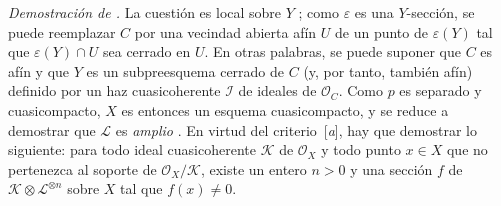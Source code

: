 \documentclass[oneside,10pt]{amsart}
\newcommand{\oldpage}[2][]{\marginnote{\normalfont\footnotesize\textbf{#1}~|~#2}\ignorespaces}
\let\EGAOriginalLabel\label
\renewcommand{\label}[1]{\phantomsection\EGAOriginalLabel{#1}}
\begin{document}
\begin{env}[8.10.6]
\label{II.8.10.6-fr}
\emph{Demostración de .}
La cuestión es local sobre $Y$ ;
como $\varepsilon$ es una $Y$-sección, se puede reemplazar $C$ por una vecindad abierta afín $U$ de un punto de $\varepsilon(Y)$ tal que $\varepsilon(Y)\cap U$ sea cerrado en $U$.
En otras palabras, se puede suponer que $C$ es afín y que $Y$ es un subpreesquema cerrado de $C$ (y, por tanto, también afín) definido por un haz cuasicoherente
\oldpage[II]{188}
$\mathcal{I}$ de ideales de $\mathcal{O}_C$.
Como $p$ es separado y cuasicompacto, $X$ es entonces un esquema cuasicompacto, y se reduce a demostrar que $\mathcal{L}$ es \emph{amplio} .
En virtud del criterio~[\emph{a}], hay que demostrar lo siguiente:
para todo ideal cuasicoherente $\mathcal{K}$ de $\mathcal{O}_X$ y todo punto $x\in X$ que no pertenezca al soporte de $\mathcal{O}_X/\mathcal{K}$, existe un entero $n>0$ y una sección $f$ de $\mathcal{K}\otimes\mathcal{L}^{\otimes n}$ sobre $X$ tal que $f(x)\neq0$.


\end{env}
\end{document}
